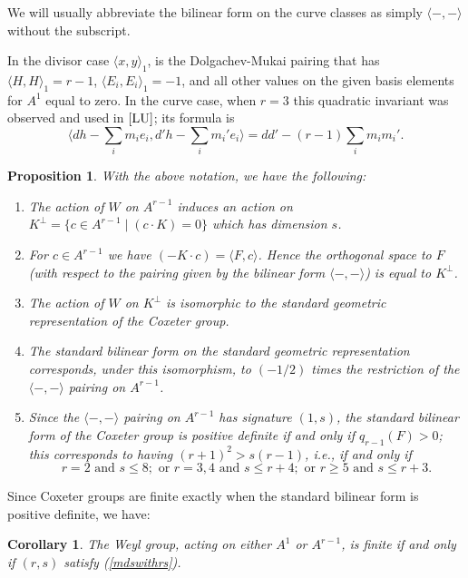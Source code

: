 \documentclass[12pt]{article}
\newtheorem{corollary}[equation]{Corollary}
\newtheorem{proposition}[equation]{Proposition}
\numberwithin{equation}{section}
\numberwithin{subeq}{equation}
\begin{document}
We will usually abbreviate the bilinear form on the curve classes
as simply $\langle -,- \rangle$ without the subscript.

In the divisor case $\langle x, y \rangle_1$, is the Dolgachev-Mukai pairing
that has $\langle H, H \rangle_1 = r-1$, $\langle E_i, E_i \rangle_1 = -1$,
and all other values on the given basis elements for $A^1$ equal to zero.
In the curve case, when $r=3$ this quadratic invariant was observed and used in $\cite{LU}$;
its formula is
\[
\langle dh-\sum_i m_ie_i, d'h-\sum_i m_i'e_i\rangle = dd'-(r-1)\sum_i m_i m_i'.
\]

\begin{proposition} With the above notation, we have the following:
\begin{enumerate}
\item The action of $W$ on $A^{r-1}$ induces an action on
$K^\perp = \{c\in A^{r-1}\;|\; (c\cdot K) = 0\}$ which has dimension $s$.
\item For $c \in A^{r-1}$ we have $(-K \cdot c) = \langle F, c\rangle$.
Hence the orthogonal space to $F$
(with respect to the pairing given by the bilinear form $\langle -,-\rangle$)
is equal to $K^\perp$.
\item The action of $W$ on $K^\perp$
is isomorphic to the standard geometric representation of the Coxeter group.
\item The standard bilinear form on the standard geometric representation corresponds,
under this isomorphism,
to $(-1/2)$ times the restriction of the $\langle -,-\rangle$ pairing on $A^{r-1}$.

\item Since the $\langle -,-\rangle$ pairing on $A^{r-1}$ has signature $(1,s)$,
the standard bilinear form of the Coxeter group is positive definite
if and only if $q_{r-1}(F)  > 0$;
this corresponds to having $(r+1)^2>s(r-1)$,
i.e., if and only if
\begin{equation}\label{mdswithrs}
r=2 \text{ and } s \leq 8; \text{ or } r=3, 4 \text{ and } s \leq r+4; \text{ or } r\geq 5 \text{ and }  s \leq r+3.
\end{equation}
\end{enumerate}
\end{proposition}

Since Coxeter groups are finite exactly when the standard bilinear form is positive definite, we have:

\begin{corollary}
The Weyl group, acting on either $A^1$ or $A^{r-1}$, is finite if and only if
$(r,s)$ satisfy (\ref{mdswithrs}).
\end{corollary}
\end{document}
